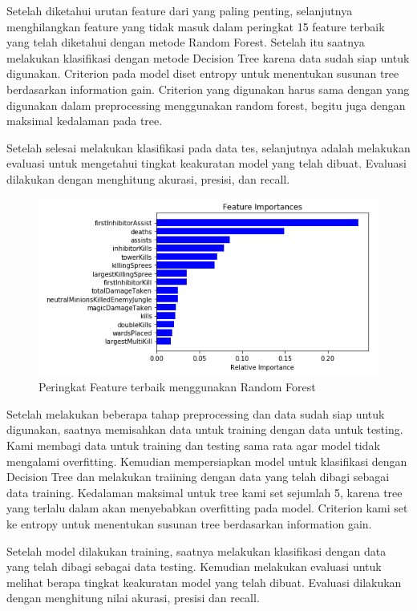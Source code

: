 \documentclass[conference]{IEEEtran}
\begin{document}
Setelah diketahui urutan feature dari yang paling penting, selanjutnya menghilangkan feature yang tidak masuk dalam peringkat 15 feature terbaik yang telah diketahui dengan metode Random Forest. Setelah itu saatnya melakukan klasifikasi dengan metode Decision Tree karena data sudah siap untuk digunakan. Criterion pada model diset entropy untuk menentukan susunan tree berdasarkan information gain. Criterion yang digunakan harus sama dengan yang digunakan dalam preprocessing menggunakan random forest, begitu juga dengan maksimal kedalaman pada tree.

Setelah selesai melakukan klasifikasi pada data tes, selanjutnya adalah melakukan evaluasi untuk mengetahui tingkat keakuratan model yang telah dibuat. Evaluasi dilakukan dengan menghitung akurasi, presisi, dan recall.

\begin{figure}
\caption{Peringkat Feature terbaik menggunakan Random Forest}
\begin{center}
\includegraphics[scale=.6]{FeatureImportances.png}
\end{center}
\end{figure}

Setelah melakukan beberapa tahap preprocessing dan data sudah siap untuk digunakan, saatnya memisahkan data untuk training dengan data untuk testing. Kami membagi data untuk training dan testing sama rata agar model tidak mengalami overfitting. Kemudian mempersiapkan model untuk klasifikasi dengan Decision Tree dan melakukan traiining dengan data yang telah dibagi sebagai data training. Kedalaman maksimal untuk tree kami set sejumlah 5, karena tree yang terlalu dalam akan menyebabkan overfitting pada model. Criterion kami set ke entropy untuk menentukan susunan tree berdasarkan information gain.

Setelah model dilakukan training, saatnya melakukan klasifikasi dengan data yang telah dibagi sebagai data testing. Kemudian melakukan evaluasi untuk melihat berapa tingkat keakuratan model yang telah dibuat. Evaluasi dilakukan dengan menghitung nilai akurasi, presisi dan recall.
\end{document}
